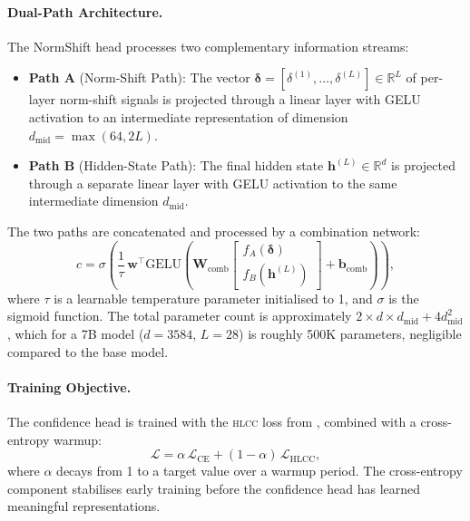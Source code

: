 \documentclass[11pt,a4paper]{article}
\newcommand{\hlcc}{\textsc{hlcc}}
\newcommand{\R}{\mathbb{R}}
\begin{document}
\paragraph{Dual-Path Architecture.}
The NormShift head processes two complementary information streams:

\begin{itemize}[nosep]
  \item \textbf{Path A} (Norm-Shift Path): The vector
        $\boldsymbol{\delta} = [\delta^{(1)}, \ldots, \delta^{(L)}] \in \R^{L}$
        of per-layer norm-shift signals is projected through a linear
        layer with GELU activation to an intermediate representation of
        dimension $d_{\text{mid}} = \max(64, 2L)$.
  \item \textbf{Path B} (Hidden-State Path): The final hidden state
        $\mathbf{h}^{(L)} \in \R^{d}$ is projected through a separate
        linear layer with GELU activation to the same intermediate
        dimension $d_{\text{mid}}$.
\end{itemize}

The two paths are concatenated and processed by a combination network:
\begin{equation}
  c = \sigma\!\left(\frac{1}{\tau}\,\mathbf{w}^{\top}
  \text{GELU}\!\left(\mathbf{W}_{\text{comb}}
  \begin{bmatrix} f_{A}(\boldsymbol{\delta}) \\ f_{B}(\mathbf{h}^{(L)}) \end{bmatrix}
  + \mathbf{b}_{\text{comb}}\right)\right),
\end{equation}
where $\tau$ is a learnable temperature parameter initialised to 1, and
$\sigma$ is the sigmoid function.  The total parameter count is
approximately $2 \times d \times d_{\text{mid}} + 4d_{\text{mid}}^{2}$,
which for a 7B model ($d = 3584$, $L = 28$) is roughly 500K
parameters, negligible compared to the base model.

\paragraph{Training Objective.}
The confidence head is trained with the \hlcc{} loss from
, combined with a cross-entropy warmup:
\begin{equation}
  \mathcal{L} = \alpha\,\mathcal{L}_{\text{CE}} + (1-\alpha)\,\mathcal{L}_{\text{HLCC}},
  \label{eq:combined-loss}
\end{equation}
where $\alpha$ decays from 1 to a target value over a warmup period.
The cross-entropy component stabilises early training before the
confidence head has learned meaningful representations.
\end{document}
